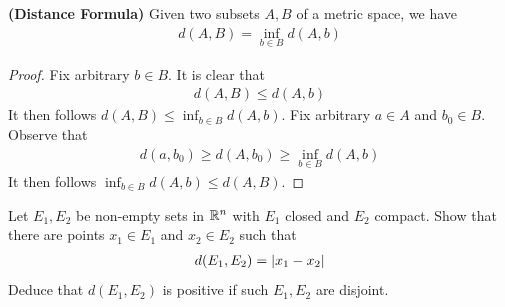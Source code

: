 \documentclass{report}
\begin{document}
\begin{theorem}
\textbf{(Distance Formula)} Given two subsets $A,B$ of a metric space, we have 
\begin{align*}
d(A,B)= \inf_{b \in B}d(A,b)
\end{align*}
\end{theorem}
\begin{proof}
Fix arbitrary $b \in B$. It is clear that 
\begin{align*}
d(A,B)\leq d(A,b)
\end{align*}
It then follows $d(A,B)\leq \inf_{b \in B}d(A,b)$. Fix arbitrary $a \in A$ and $b_0 \in B$. Observe that 
\begin{align*}
d(a,b_0)\geq  d(A,b_0) \geq \inf_{b \in B}d(A,b)
\end{align*}
It then follows $\inf_{b \in B}d(A,b)\leq d(A,B)$. 
\end{proof}
\begin{question}{}{}
Let $E_1,E_2$ be non-empty sets in  $\mathbb{R}^n$ with $E_1$ closed and  $E_2$ compact. Show that there are points  $x_1\in E_1$ and $x_2 \in E_2$ such that 
\begin{align*}
d(E_1,E_2)=\left|x_1-x_2\right|
\end{align*}
Deduce that $d(E_1,E_2)$ is positive if such $E_1,E_2$ are disjoint. 
\end{question}
\end{document}
